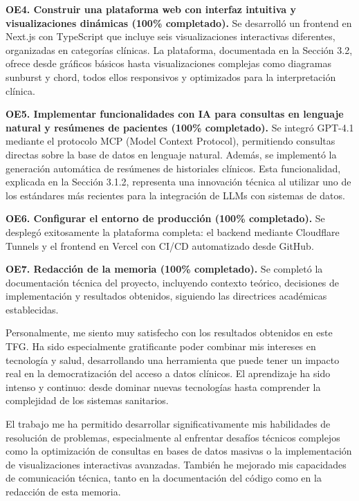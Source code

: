 \textbf{OE4. Construir una plataforma web con interfaz intuitiva y visualizaciones dinámicas (100\% completado).} Se desarrolló un frontend en Next.js con TypeScript que incluye seis visualizaciones interactivas diferentes, organizadas en categorías clínicas. La plataforma, documentada en la Sección 3.2, ofrece desde gráficos básicos hasta visualizaciones complejas como diagramas sunburst y chord, todos ellos responsivos y optimizados para la interpretación clínica.

\textbf{OE5. Implementar funcionalidades con IA para consultas en lenguaje natural y resúmenes de pacientes (100\% completado).} Se integró GPT-4.1 mediante el protocolo MCP (Model Context Protocol), permitiendo consultas directas sobre la base de datos en lenguaje natural. Además, se implementó la generación automática de resúmenes de historiales clínicos. Esta funcionalidad, explicada en la Sección 3.1.2, representa una innovación técnica al utilizar uno de los estándares más recientes para la integración de LLMs con sistemas de datos.

\textbf{OE6. Configurar el entorno de producción (100\% completado).} Se desplegó exitosamente la plataforma completa: el backend mediante Cloudflare Tunnels y el frontend en Vercel con CI/CD automatizado desde GitHub. 

\textbf{OE7. Redacción de la memoria (100\% completado).} Se completó la documentación técnica del proyecto, incluyendo contexto teórico, decisiones de implementación y resultados obtenidos, siguiendo las directrices académicas establecidas.



Personalmente, me siento muy satisfecho con los resultados obtenidos en este TFG. Ha sido especialmente gratificante poder combinar mis intereses en tecnología y salud, desarrollando una herramienta que puede tener un impacto real en la democratización del acceso a datos clínicos. El aprendizaje ha sido intenso y continuo: desde dominar nuevas tecnologías hasta comprender la complejidad de los sistemas sanitarios.




El trabajo me ha permitido desarrollar significativamente mis habilidades de resolución de problemas, especialmente al enfrentar desafíos técnicos complejos como la optimización de consultas en bases de datos masivas o la implementación de visualizaciones interactivas avanzadas. También he mejorado mis capacidades de comunicación técnica, tanto en la documentación del código como en la redacción de esta memoria.


